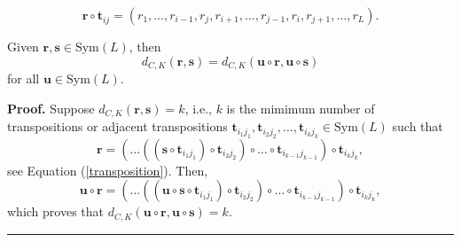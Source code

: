 \documentclass[10pt,a4paper]{amsart}
\newenvironment{proof}[1][Proof]{\noindent\textbf{#1.} }{\ \rule{0.5em}{0.5em}}
\begin{document}
\begin{equation}
\mathbf{r\circ t}%
_{ij}=(r_{1},\ldots,r_{i-1},r_{j},r_{i+1},\ldots,r_{j-1},r_{i},r_{j+1},\ldots,r_{L}).
\label{transposition}
\end{equation}%

\begin{proposition}\label{PropInvariance} 
Given $\mathbf{r},\mathbf{s}\in \mathrm{Sym}(L)$, then%
\begin{equation}
d_{C,K}(\mathbf{r},\mathbf{s})=d_{C,K}(\mathbf{u}\circ \mathbf{r},\mathbf{u}%
\circ \mathbf{s})  \label{left invariance}
\end{equation}%
for all $\mathbf{u}\in \mathrm{Sym}(L)$.
\end{proposition}

\begin{proof}
Suppose $d_{C,K}(\mathbf{r},\mathbf{s})=k$, i.e., $k$ is the mimimum number
of transpositions or adjacent transpositions $\mathbf{t}_{i_{1}j_{1}},%
\mathbf{t}_{i_{2}j_{2}},\ldots,\mathbf{t}_{i_{k}j_{k}}\in \mathrm{Sym}(L)$ such
that%
\begin{equation*}
\mathbf{r}=(\ldots((\mathbf{s}\circ \mathbf{t}_{i_{1}j_{1}})\circ \mathbf{t}%
_{i_{2}j_{2}})\circ \ldots \circ \mathbf{t}_{i_{k-1}j_{k-1}})\circ \mathbf{t}%
_{i_{k}j_{k}},
\end{equation*}%
see Equation (\ref{transposition}). Then,%
\begin{equation*}
\mathbf{u}\circ \mathbf{r}=(\ldots((\mathbf{u}\circ \mathbf{s}\circ \mathbf{t}%
_{i_{1}j_{1}})\circ \mathbf{t}_{i_{2}j_{2}})\circ \ldots \circ \mathbf{t}%
_{i_{k-1}j_{k-1}})\circ \mathbf{t}_{i_{k}j_{k}},
\end{equation*}%
which proves that $d_{C,K}(\mathbf{u}\circ \mathbf{r},\mathbf{u}\circ 
\mathbf{s})=k.$
\end{proof}
\end{document}
